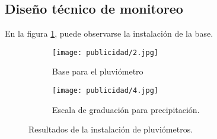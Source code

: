 \subsection{Diseño técnico de monitoreo}




En la figura \ref{publicidad2}, puede observarse la instalación de la base.

\begin{figure}[h!]
	\centering
	\begin{subfigure} 
		\centering
		\texttt{[image: publicidad/2.jpg]}
		\caption{Base para el pluviómetro}
		\label{publicidad2}
	\end{subfigure} 
	\begin{subfigure} 
		\centering
		\texttt{[image: publicidad/4.jpg]}
		\caption{Escala de graduación para precipitación.}
		\label{publicidad4}
	\end{subfigure}
	\caption{Resultados de la instalación de pluviómetros.}
	\label{publicidad24-}
\end{figure}


